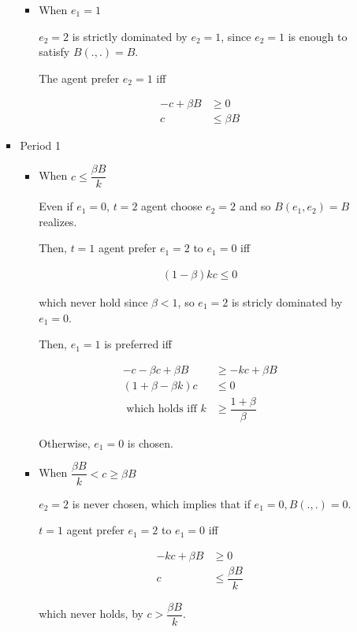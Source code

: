 \documentclass{jsarticle}
\begin{document}
\begin{enumerate}
\begin{enumerate}
\begin{itemize}
\begin{itemize}
\item When $e_1=1$

$e_2=2$ is strictly dominated by $e_2=1$, since $e_2=1$ is enough to satisfy $B(.,.)=B$.

The agent prefer $e_2=1$ iff

\begin{align*}
-c + \beta B & \geq 0 \\
c & \leq \beta B
\end{align*}

\end{itemize}

\newpage

\item Period 1

\begin{itemize}

\item When $c \leq \dfrac{\beta B}{k}$

Even if $e_1=0$, $t=2$ agent choose $e_2=2$ and so $B(e_1, e_2)=B$ realizes.

Then, $t=1$ agent prefer $e_1=2$ to $e_1=0$ iff

\begin{align*}
(1-\beta)kc \leq 0
\end{align*}

which never hold since $\beta<1$, so $e_1=2$ is stricly dominated by $e_1=0$.

Then, $e_1=1$ is preferred iff

\begin{align*}
-c - \beta c + \beta B &\geq - kc + \beta B \\
(1+\beta - \beta k)c &\leq 0 \\
\text{ which holds iff }
k &\geq \dfrac{1+\beta}{\beta}
\end{align*}

Otherwise, $e_1=0$ is chosen.

\item When $\dfrac{\beta B}{k} < c \geq \beta B $

$e_2=2$ is never chosen, which implies that if $e_1=0,B(.,.)=0$.

$t=1$ agent prefer $e_1=2$ to $e_1=0$ iff

\begin{align*}
- kc + \beta B &\geq 0 \\
c &\leq \dfrac{\beta B}{k}
\end{align*}

which never holds, by $c>\dfrac{\beta B}{k}$.


\end{itemize}
\end{itemize}
\end{enumerate}
\end{enumerate}
\end{document}
